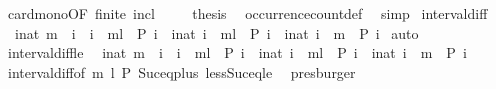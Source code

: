 \begin{isabellebody}
\ card{\isacharunderscore}mono{\isacharbrackleft}OF\ finite\ incl{\isacharbrackright}\ \isacommand{{\isachardot}}\isamarkupfalse%
\isanewline
\ \ \isamarkupfalse%
\ {\isacharquery}thesis\ \isamarkupfalse%
\ occurrence{\isacharunderscore}count{\isacharunderscore}def\ \isamarkupfalse%
\ simp\isanewline
{}\isamarkupfalse%
%
\endisatagproof
{\isafoldproof}%
%
\isadelimproof
\isanewline
%
\endisadelimproof
\isanewline
{}\isamarkupfalse%
\ interval{\isacharunderscore}diff{\isacharcolon}\isanewline
\ \ {\isacartoucheopen}{\isacharbraceleft}i{\isacharcolon}{\isacharcolon}nat{\isachardot}\ m\ {\isasymle}\ i\ {\isasymand}\ i\ {\isasymle}\ m{\isacharplus}l\ {\isasymand}\ P\ i{\isacharbraceright}\ {\isacharequal}\ {\isacharbraceleft}i{\isacharcolon}{\isacharcolon}nat{\isachardot}\ i\ {\isasymle}\ m{\isacharplus}l\ {\isasymand}\ P\ i{\isacharbraceright}\ {\isacharminus}\ {\isacharbraceleft}i{\isacharcolon}{\isacharcolon}nat{\isachardot}\ i\ {\isacharless}\ m\ {\isasymand}\ P\ i{\isacharbraceright}{\isacartoucheclose}\isanewline
%
\isadelimproof
%
\endisadelimproof
%
\isatagproof
{}\isamarkupfalse%
\ auto%
\endisatagproof
{\isafoldproof}%
%
\isadelimproof
\isanewline
%
\endisadelimproof
\isanewline
{}\isamarkupfalse%
\ interval{\isacharunderscore}diff{\isacharunderscore}le{\isacharcolon}\isanewline
\ \ {\isacartoucheopen}{\isacharbraceleft}i{\isacharcolon}{\isacharcolon}nat{\isachardot}\ m{\isacharplus}{}\ {\isasymle}\ i\ {\isasymand}\ i\ {\isacharless}\ m{\isacharplus}{}{\isacharplus}l{\isacharplus}{}\ {\isasymand}\ P\ i{\isacharbraceright}\ {\isacharequal}\ {\isacharbraceleft}i{\isacharcolon}{\isacharcolon}nat{\isachardot}\ i\ {\isasymle}\ m{\isacharplus}{}{\isacharplus}l\ {\isasymand}\ P\ i{\isacharbraceright}\ {\isacharminus}\ {\isacharbraceleft}i{\isacharcolon}{\isacharcolon}nat{\isachardot}\ i\ {\isasymle}\ m\ {\isasymand}\ P\ i{\isacharbraceright}{\isacartoucheclose}\isanewline
%
\isadelimproof
%
\endisadelimproof
%
\isatagproof
{}\isamarkupfalse%
\ interval{\isacharunderscore}diff{\isacharbrackleft}of\ {\isacartoucheopen}m{\isacharplus}{}{\isacartoucheclose}\ {\isacartoucheopen}l{\isacartoucheclose}\ P{\isacharbrackright}\ Suc{\isacharunderscore}eq{\isacharunderscore}plus{}\ less{\isacharunderscore}Suc{\isacharunderscore}eq{\isacharunderscore}le\ \isamarkupfalse%
\ presburger%
\endisatagproof
{\isafoldproof}%
%
\isadelimproof
\isanewline
%
\endisadelimproof

\end{isabellebody}
